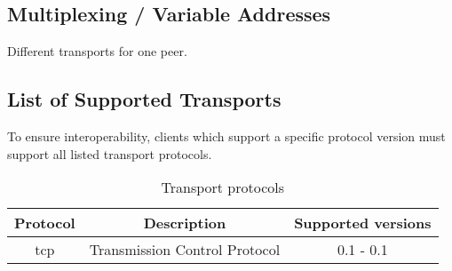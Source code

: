 \subsection{Multiplexing / Variable Addresses}
\label{multiplexing}
Different transports for one peer.

\subsection{List of Supported Transports}
To ensure interoperability, clients which support a specific
protocol version must support all listed transport protocols.
\begin{longtable}{|c|c|c|}
\caption{Transport protocols}\\
\hline
\textbf{Protocol} & \textbf{Description} & \textbf{Supported versions}\\
\hline
tcp & Transmission Control Protocol & 0.1 - 0.1\\
\hline
\end{longtable}


